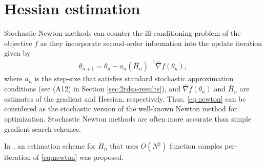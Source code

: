 \section{Hessian estimation}\label{sec:hesest}
Stochastic Newton methods can counter the ill-conditioning problem of the objective $f$ as they incorporate second-order information into the update iteration given by   
\begin{align}
\label{eq:newton}
\theta_{n+1} = \theta_n - a_n (\overline H_n)^{-1}\widehat\nabla f(\theta_n), 
\end{align}
where $a_n$ is the step-size that satisfies standard stochastic approximation conditions (see (A12) in Section \ref{sec:2rdsa-results}), and $\widehat\nabla f(\theta_n)$ and $\overline H_n$ are estimates of the gradient and Hessian, respectively. Thus, \eqref{eq:newton} can be considered as  the stochastic version of the well-known Newton method for optimization. Stochastic Newton methods are often more accurate than simple gradient search schemes.

In \cite{fabian}, an estimation scheme for $\overline H_n$ that uses $O(N^2)$ function samples per-iteration of \eqref{eq:newton} was proposed.

